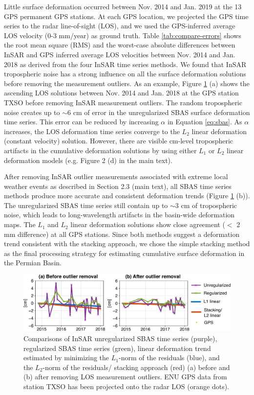 Little surface deformation occurred between Nov. 2014 and Jan. 2019 at the 13 GPS permanent GPS stations. At each GPS location, we projected the GPS time series to the radar line-of-sight (LOS), and we used the GPS-inferred average LOS velocity (0-3 mm/year) as ground truth. Table \ref{tab:compare-errors} shows the root mean square (RMS) and the worst-case absolute differences between InSAR and GPS inferred average LOS velocities between Nov. 2014 and Jan. 2018 as derived from the four InSAR time series methods. We found that InSAR tropospheric noise has a strong influence on all the surface deformation solutions before removing the measurement outliers. As an example, Figure \ref{fig:compare} (a) shows the ascending LOS solutions between Nov. 2014 and Jan. 2018 at the GPS station TXSO before removing InSAR measurement outliers. The random tropospheric noise creates up to $\sim$6 cm of error in the unregularized SBAS surface deformation time series. This error can be reduced by increasing $ \alpha$ in Equation \eqref{eq:sbas}. As $\alpha$ increases, the LOS deformation time series converge to the $L_2$ linear deformation (constant velocity) solution. However, there are visible cm-level tropospheric artifacts in the cumulative deformation solutions by using either $L_1$ or $L_2$ linear deformation models (e.g. Figure 2 (d) in the main text). 

After removing InSAR outlier measurements associated with extreme local weather events as described in Section 2.3 (main text), all SBAS time series methods produce more accurate and consistent deformation trends (Figure \ref{fig:compare} (b)). The unregularized SBAS time series still contain up to $\sim$3 cm of tropospheric noise, which leads to long-wavelength artifacts in the basin-wide deformation maps. The $ L_1 $ and $ L_2 $ linear deformation solutions show close agreement ($<$ 2 mm difference) at all GPS stations. Since both methods suggest a deformation trend consistent with the stacking approach, we chose the simple stacking method as the final processing strategy for estimating cumulative surface deformation in the Permian Basin.

\begin{figure}
	\centering
	\includegraphics[width=\textwidth]{paper1-permian/figures/supplement/figureS5-compare-insar-2panel.pdf}
	\caption[Comparisons of InSAR SBAS solutions]{Comparisons of InSAR unregularized SBAS time series (purple), regularized SBAS time series (green), linear deformation trend estimated by minimizing the $L_1$-norm of the residuals (blue), and the $L_2$-norm of the residuals/ stacking approach (red)  (a) before and (b) after removing LOS measurement outliers. ENU GPS data from station TXSO has been projected onto the radar LOS (orange dots).}
	\label{fig:compare}
\end{figure}

